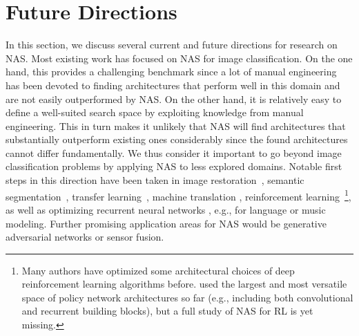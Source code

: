 \documentclass[twoside,11pt]{article}
\renewcommand{\cite}[1]{\citep{#1}}
\newcommand{\note}[1]{
	\noindent~\\
	\vspace{0.25cm}
	\fcolorbox{red}{yellow}{\parbox{0.97\textwidth}{#1\\}}
	\vspace{0.25cm}
}
\begin{document}
\section{Future Directions}\label{Section:outlook} 
In this section, we discuss several current and future directions for research on NAS. Most existing work has focused on NAS for image classification. On the one hand, this provides a challenging benchmark since a lot of manual engineering has been devoted to finding architectures that perform well in this domain and are not easily outperformed by NAS. On the other hand, it is relatively easy to define a well-suited search space by exploiting knowledge from manual engineering. This in turn makes it unlikely that NAS will find architectures that substantially outperform existing ones considerably since the found architectures cannot differ fundamentally. We thus consider it important to go beyond image classification problems by applying NAS to less explored domains. %
Notable first steps in this direction have been taken in image restoration~\cite{pmlr-v80-suganuma18a}, semantic segmentation~\citep{NIPS2018_8087, Nekrasov_semseg, liu_autodeeplab}, transfer learning~\citep{NIPS2018_8056}, machine translation \cite{so_transfomrer}, 
reinforcement learning~\cite{runge2019learning}\footnote{Many authors have optimized some architectural choices of deep reinforcement learning algorithms before. \citet{runge2019learning} used the largest and most versatile space of policy network architectures so far (e.g., including both convolutional and recurrent building blocks), but a full study of NAS for RL is yet missing.}, as well as optimizing recurrent neural networks \cite{greff_2015, pmlr-v37-jozefowicz15, DBLP:journals/corr/ZophL16,rawal_nodes_2018}, e.g., for language or music modeling. Further promising application areas for NAS would be generative adversarial networks or sensor fusion.
\end{document}
